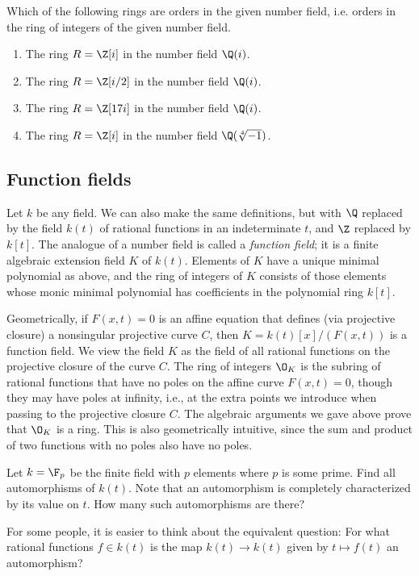 \begin{exercise}
	Which of the following rings are orders in the given
	number field, i.e. orders in the ring of integers of the
	given number field.
	\begin{enumerate}[label=(\emph{\alph*})]
		\item The ring $R = \Z[i]$ in the number field $\Q(i)$.
		\item The ring $R = \Z[i/2]$ in the number field $\Q(i)$.
		\item The ring $R = \Z[17i]$ in the number field $\Q(i)$.
		\item The ring $R = \Z[i]$ in the number field $\Q(\sqrt[4]{-1})$.
	\end{enumerate}
\end{exercise}

\subsection{Function fields}
Let $k$ be any field.  We can also make the same definitions, but with $\Q$
replaced by the field $k(t)$ of rational functions in an indeterminate
$t$, and $\Z$ replaced by $k[t]$.
The analogue of a number field is called a {\em function field}; it is
a finite algebraic extension field $K$ of $k(t)$.  Elements of $K$
have a unique minimal polynomial as above, and the ring of integers of
$K$ consists of those elements whose monic minimal polynomial has
coefficients in the polynomial ring $k[t]$.

Geometrically, if $F(x,t)=0$ is an affine equation that defines (via
projective closure) a nonsingular projective curve $C$, then
$K=k(t)[x]/(F(x,t))$ is a function field.  We view the field $K$ as
the field of all rational functions on the projective closure of the
curve $C$.  The ring of integers $\O_K$ is the subring of rational
functions that have no poles on the affine curve $F(x,t)=0$, though
they may have poles at infinity, i.e., at the extra points we
introduce when passing to the projective closure $C$.  The algebraic
arguments we gave above prove that $\O_K$ is a ring.  This is also
geometrically intuitive, since the sum and product of two functions
with no poles also have no poles.

\begin{exercise}
	Let $k = \F_p$ be the finite field with $p$ elements where $p$ is some prime. Find all automorphisms of $k(t)$. Note that an automorphism is completely characterized by its value on $t$. How many such automorphisms are there?

	\begin{hint}
		For some people, it is easier to think about the equivalent question: For what rational functions $f\in k(t)$ is the map $k(t)\to k(t)$ given by $t\mapsto f(t)$ an automorphism?
	\end{hint}
\end{exercise}

